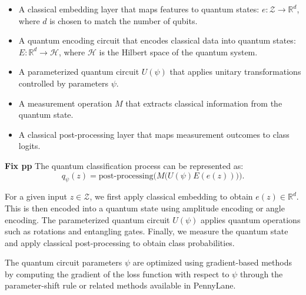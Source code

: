 \documentclass[11pt, conference]{IEEEtran}
\begin{document}
\begin{itemize}
    \item A classical embedding layer that maps features to quantum states: \( e: \mathcal{Z} \to \mathbb{R}^d \), where \( d \) is chosen to match the number of qubits.
    \item A quantum encoding circuit that encodes classical data into quantum states: \( E: \mathbb{R}^d \to \mathcal{H} \), where \( \mathcal{H} \) is the Hilbert space of the quantum system.
    \item A parameterized quantum circuit \( U(\psi) \) that applies unitary transformations controlled by parameters \( \psi \).
    \item A measurement operation \( M \) that extracts classical information from the quantum state.
    \item A classical post-processing layer that maps measurement outcomes to class logits.
\end{itemize}

\textbf{Fix pp}
The quantum classification process can be represented as:
\[
q_{\psi}(z) = \text{post-processing} \Big( M \big( U(\psi) E(e(z)) \big) \Big).
\]

For a given input \( z \in \mathcal{Z} \), we first apply classical embedding to obtain \( e(z) \in \mathbb{R}^d \). This is then encoded into a quantum state using amplitude encoding or angle encoding. The parameterized quantum circuit \( U(\psi) \) applies quantum operations such as rotations and entangling gates. Finally, we measure the quantum state and apply classical post-processing to obtain class probabilities.

The quantum circuit parameters \( \psi \) are optimized using gradient-based methods by computing the gradient of the loss function with respect to \( \psi \) through the parameter-shift rule or related methods available in PennyLane.
\end{document}
